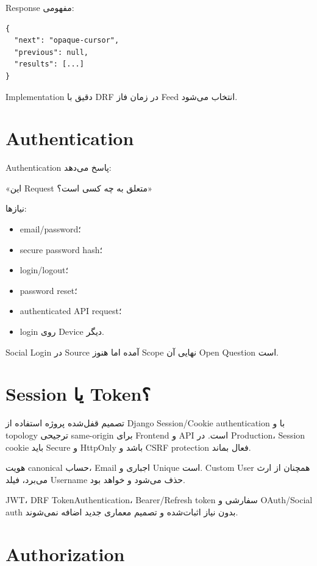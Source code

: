 Response مفهومی:
\begin{latin}
\begin{lstlisting}
{
  "next": "opaque-cursor",
  "previous": null,
  "results": [...]
}
\end{lstlisting}
\end{latin}

Implementation دقیق با DRF در زمان فاز Feed انتخاب می‌شود.

\section{Authentication}

Authentication پاسخ می‌دهد:
\begin{center}
«این Request متعلق به چه کسی است؟»
\end{center}

نیازها:
\begin{itemize}
  \item email/password؛
  \item secure password hash؛
  \item login/logout؛
  \item password reset؛
  \item authenticated API request؛
  \item login روی Device دیگر.
\end{itemize}

Social Login در Source آمده اما هنوز Scope نهایی آن Open Question است.

\section{Session یا Token؟}

تصمیم قفل‌شده پروژه استفاده از Django Session/Cookie authentication با
 و topology ترجیحی same-origin برای Frontend و API است.
در Production، Session cookie باید Secure و HttpOnly باشد و CSRF protection فعال بماند.

هویت canonical حساب، Email اجباری و Unique است. Custom User همچنان از
 ارث می‌برد، فیلد Username حذف می‌شود و
 خواهد بود.

\begin{warningbox}
JWT، DRF TokenAuthentication، Bearer/Refresh token سفارشی و OAuth/Social auth بدون
نیاز اثبات‌شده و تصمیم معماری جدید اضافه نمی‌شوند.
\end{warningbox}

\section{Authorization}

